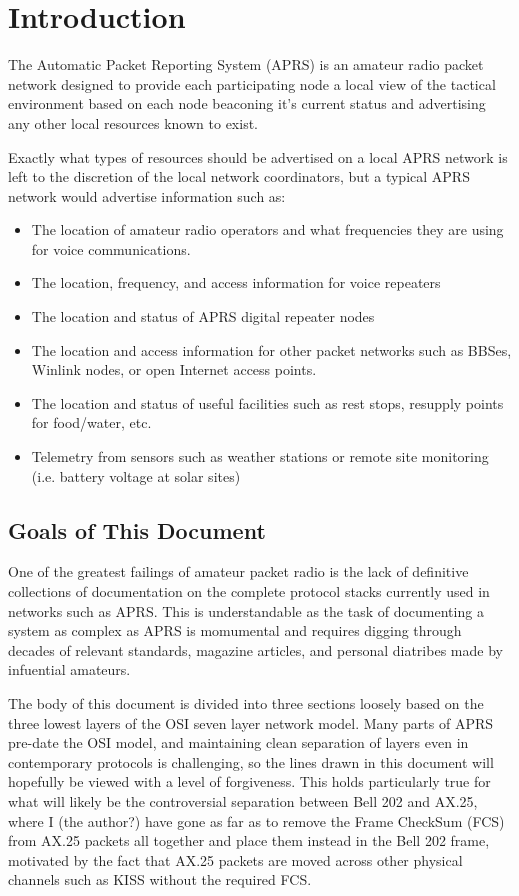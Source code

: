 

\chapter{Introduction}

The Automatic Packet Reporting System (APRS) is an amateur radio packet
network designed to provide each participating node a local view of the 
tactical environment based on each node beaconing it's current status
and advertising any other local resources known to exist.

Exactly what types of resources should be advertised on a local APRS
network is left to the discretion of the local network coordinators, but
a typical APRS network would advertise information such as:
\begin{itemize}
\item The location of amateur radio operators and what frequencies they are using for voice communications.
\item The location, frequency, and access information for voice repeaters
\item The location and status of APRS digital repeater nodes
\item The location and access information for other packet networks such as BBSes, Winlink nodes, or open Internet access points.
\item The location and status of useful facilities such as rest stops, resupply points for food/water, etc.
\item Telemetry from sensors such as weather stations or remote site monitoring (i.e. battery voltage at solar sites)
\end{itemize} 

\section{Goals of This Document}

One of the greatest failings of amateur packet radio is the lack of definitive
collections of documentation on the complete protocol stacks currently used in 
networks such as APRS. This is understandable as the task of documenting a 
system as complex as APRS is momumental and requires digging through decades of 
relevant standards, magazine articles, and personal diatribes made by infuential
amateurs.

The body of this document is divided into three sections loosely based on the 
three lowest layers of the OSI seven layer network model. Many parts of APRS
pre-date the OSI model, and maintaining clean separation of layers even in 
contemporary protocols is challenging, so the lines drawn in this document will
hopefully be viewed with a level of forgiveness. This holds particularly true 
for what will likely be the controversial separation between Bell 202 and AX.25, 
where I (the author?) have gone as far as to
remove the Frame CheckSum (FCS) from AX.25 packets all together and place them
instead in the Bell 202 frame, motivated by the fact that AX.25 packets are moved
across other physical channels such as KISS without the required FCS.

